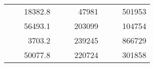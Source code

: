 \begin{table}[]
\begin{tabular}{|ccrccrccc}
\rowcolor[HTML]{DDFDFF} 
\multicolumn{1}{|c|}{\cellcolor[HTML]{FFFFC7}}                                & \multicolumn{1}{c|}{\cellcolor[HTML]{DDFDFF}}                      & \multicolumn{1}{r|}{\cellcolor[HTML]{DAE8FC}18382.8}   & \multicolumn{1}{c|}{\cellcolor[HTML]{FFFFC7}}                                & \multicolumn{1}{c|}{\cellcolor[HTML]{DDFDFF}}                       & \multicolumn{1}{r|}{\cellcolor[HTML]{DDFDFF}47981}     & \multicolumn{1}{c|}{\cellcolor[HTML]{FFFFC7}}                                & \multicolumn{1}{c|}{\cellcolor[HTML]{DDFDFF}}                      & \multicolumn{1}{r|}{\cellcolor[HTML]{DDFDFF}501953}    \\ \cline{3-3} \cline{6-6} \cline{9-9} 
\multicolumn{1}{|c|}{\cellcolor[HTML]{FFFFC7}}                                & \multicolumn{1}{c|}{\cellcolor[HTML]{DDFDFF}}                      & \multicolumn{1}{r|}{\cellcolor[HTML]{DDFDFF}56493.1}   & \multicolumn{1}{c|}{\cellcolor[HTML]{FFFFC7}}                                & \multicolumn{1}{c|}{\cellcolor[HTML]{DDFDFF}}                       & \multicolumn{1}{r|}{\cellcolor[HTML]{DAE8FC}203099}    & \multicolumn{1}{c|}{\cellcolor[HTML]{FFFFC7}}                                & \multicolumn{1}{c|}{\cellcolor[HTML]{DDFDFF}}                      & \multicolumn{1}{r|}{\cellcolor[HTML]{DAE8FC}104754}    \\ \cline{3-3} \cline{6-6} \cline{9-9} 
\rowcolor[HTML]{DDFDFF} 
\multicolumn{1}{|c|}{\cellcolor[HTML]{FFFFC7}}                                & \multicolumn{1}{c|}{\cellcolor[HTML]{DDFDFF}}                      & \multicolumn{1}{r|}{\cellcolor[HTML]{DAE8FC}3703.2}    & \multicolumn{1}{c|}{\cellcolor[HTML]{FFFFC7}}                                & \multicolumn{1}{c|}{\cellcolor[HTML]{DDFDFF}}                       & \multicolumn{1}{r|}{\cellcolor[HTML]{DDFDFF}239245}    & \multicolumn{1}{c|}{\cellcolor[HTML]{FFFFC7}}                                & \multicolumn{1}{c|}{\cellcolor[HTML]{DDFDFF}}                      & \multicolumn{1}{r|}{\cellcolor[HTML]{DDFDFF}866729}    \\ \cline{3-3} \cline{6-6} \cline{9-9} 
\multicolumn{1}{|c|}{\cellcolor[HTML]{FFFFC7}}                                & \multicolumn{1}{c|}{\cellcolor[HTML]{DDFDFF}}                      & \multicolumn{1}{r|}{\cellcolor[HTML]{DDFDFF}50077.8}   & \multicolumn{1}{c|}{\cellcolor[HTML]{FFFFC7}}                                & \multicolumn{1}{c|}{\cellcolor[HTML]{DDFDFF}}                       & \multicolumn{1}{r|}{\cellcolor[HTML]{DAE8FC}220724}    & \multicolumn{1}{c|}{\cellcolor[HTML]{FFFFC7}}                                & \multicolumn{1}{c|}{\cellcolor[HTML]{DDFDFF}}                      & \multicolumn{1}{r|}{\cellcolor[HTML]{DAE8FC}301858}    \\ \cline{3-3} \cline{6-6} \cline{9-9} 

\end{tabular}
\end{table}
